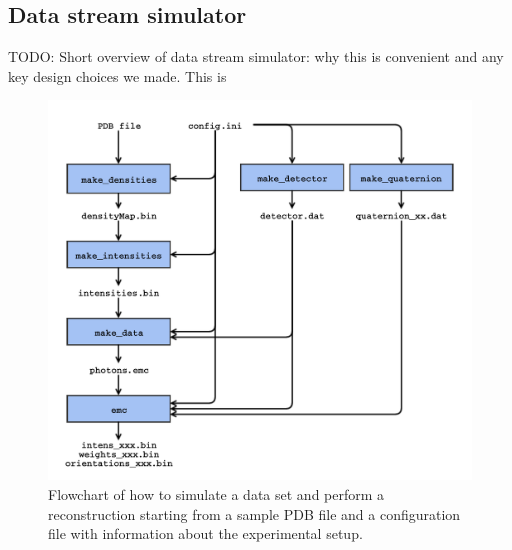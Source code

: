 \documentclass[]{iucr}              %
\begin{document}
\subsection{Data stream simulator}\label{sec:dataStreamSim}

TODO: Short overview of data stream simulator: why this is convenient and any key design choices we made.
This is

\begin{figure}
\caption{Flowchart of how to simulate a data set and perform a reconstruction starting from a sample PDB file and a configuration file with information about the experimental setup.}
\includegraphics[width=\textwidth]{figures/emc_sim.pdf}
\end{figure}
\end{document}
